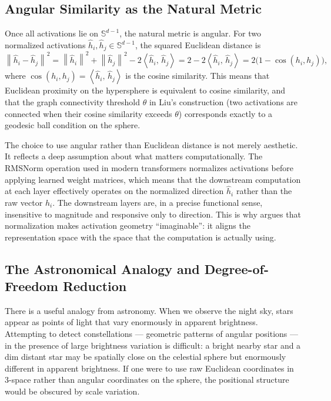 \documentclass[12pt, a4paper]{article}
\theoremstyle{plain}
\theoremstyle{definition}
\theoremstyle{remark}
\newcommand{\Sph}{\mathbb{S}}
\newcommand{\norm}[1]{\left\|#1\right\|}
\newcommand{\ip}[2]{\left\langle #1,\, #2 \right\rangle}
\newcommand{\hh}{\hat{h}}
\begin{document}
\subsection{Angular Similarity as the Natural Metric}

Once all activations lie on $\Sph^{d-1}$, the natural metric is angular. For
two normalized activations $\hh_i, \hh_j \in \Sph^{d-1}$, the squared
Euclidean distance is
\begin{equation}
  \norm{\hh_i - \hh_j}^2
  = \norm{\hh_i}^2 + \norm{\hh_j}^2 - 2\ip{\hh_i}{\hh_j}
  = 2 - 2\ip{\hh_i}{\hh_j}
  = 2\bigl(1 - \cos(h_i, h_j)\bigr),
\end{equation}
where $\cos(h_i, h_j) = \ip{\hh_i}{\hh_j}$ is the cosine similarity. This
means that Euclidean proximity on the hypersphere is equivalent to cosine
similarity, and that the graph connectivity threshold $\theta$ in Liu's
construction (two activations are connected when their cosine similarity
exceeds $\theta$) corresponds exactly to a geodesic ball condition on the
sphere.

The choice to use angular rather than Euclidean distance is not merely
aesthetic. It reflects a deep assumption about what matters computationally.
The RMSNorm operation used in modern transformers \cite{zhang2019rmsnorm}
normalizes activations before applying learned weight matrices, which means
that the downstream computation at each layer effectively operates on the
normalized direction $\hh_i$ rather than the raw vector $h_i$. The downstream
layers are, in a precise functional sense, insensitive to magnitude and
responsive only to direction. This is why \cite{liu2026normgeometry} argues
that normalization makes activation geometry ``imaginable'': it aligns the
representation space with the space that the computation is actually using.

\subsection{The Astronomical Analogy and Degree-of-Freedom Reduction}

There is a useful analogy from astronomy. When we observe the night sky,
stars appear as points of light that vary enormously in apparent brightness.
Attempting to detect constellations --- geometric patterns of angular positions
--- in the presence of large brightness variation is difficult: a bright nearby
star and a dim distant star may be spatially close on the celestial sphere but
enormously different in apparent brightness. If one were to use raw Euclidean
coordinates in 3-space rather than angular coordinates on the sphere, the
positional structure would be obscured by scale variation.
\end{document}
